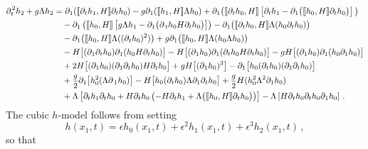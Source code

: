 \documentclass[11pt]{article}
\theoremstyle{plain}
\theoremstyle{definition}
\theoremstyle{definition}
\def\p{\text{\bf\emph{p}}}
\def\p{{\partial\hspace{1pt}}}
\def\comm#1#2{{\llbracket#1,#2\rrbracket}}
\def\smallexp#1{{\text{\small #1}}}
\def\dfrac#1#2{\smallexp{$\displaystyle{}\frac{#1}{#2}$}}
\begin{document}
\begin{align*}
\p_{\!t}^2 h_2 + g\Lambda h_2 &= \p_{\!1} (\comm{\p_{\!t} h_1}{H} \partial_t h_0) - g\p_{\!1} (\comm{h_1}{H} \Lambda h_0) + \p_{\!1} \big(\comm{\p_{\!t} h_0}{H} \left[\partial_t h_1-\p_{\!1} \big(\comm{h_0}{H} \partial_t h_0\big)\right]\big) \\
&\quad -\p_{\!1} \left(\comm{h_0}{H} \left[g \Lambda h_1 - \partial_1 \big(\p_t h_0H\partial_t h_0 \big)\right]\right) - \p_{\!1} \big(\comm{\p_{\!t} h_0}{H} \Lambda (h_0 \partial_t h_0)\big) \\
&\quad - \p_{\!1} \big(\comm{h_0}{H} \Lambda ((\p_{\!t} h_0)^2)\big) + g\p_{\!1} \big(\comm{h_0}{H} \Lambda (h_0 \Lambda h_0)\big) \\
&\quad - H \big[(\p_{\!1} \p_{\!t} h_0) \p_{\!1}(h_0 H\p_{\!t} h_0)\big] - H \big[(\p_{\!1} h_0) \p_{\!1}(\p_{\!t} h_0 H\p_{\!t} h_0)\big]
 - gH \big[(\p_{\!1} h_0) \p_{\!1}(h_0 \partial_1 h_0)\big] \nonumber\\
&\quad + 2 H \big[(\p_{\!1}h_0) (\p_{\!1} \p_{\!t} h_0) H\p_{\!t} h_0\big] + gH \big[(\p_{\!1}h_0)^3\big] - \p_{\!1} \big[h_0 (\p_{\!t} h_0) (\partial_1 \p_{\!t} h_0) \big] \\
&\quad + \dfrac{g}{2} \p_{\!1} \big[h_0^2 (\Lambda \p_{1} h_0)\big] - H \big[h_0 (\p_{\!t} h_0)\Lambda \partial_1\p_{\!t} h_0\big] + \dfrac{g}{2} H (h_0^2 \Lambda^2 \partial_1h_0)\\
&\quad +\Lambda \left[\partial_t h_{1}\partial_t h_{0}  +H\p_{\!t} h_0\left(-H\p_{\!t} h_1 + \Lambda \big(\comm{h_0}{H}  \p_{\!t} h_0\big)\right)\right]- \Lambda \left[ H\p_{\!t} h_0 \partial_t h_{0} \p_{\!1} h_{0} \right]\,.
\end{align*}
The cubic $h$-model follows from setting
$$
h(x_1,t)=  \epsilon h_0(x_1,t) + \epsilon ^2 h_1(x_1,t)+\epsilon ^3 h_2(x_1,t) \,,
$$
so that
\end{document}
